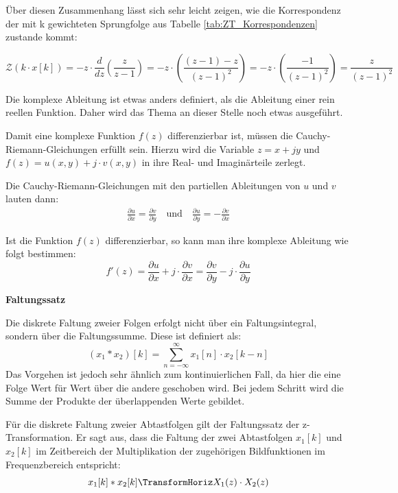 Über diesen Zusammenhang lässt sich sehr leicht zeigen, wie die Korrespondenz der mit k gewichteten Sprungfolge aus Tabelle \ref{tab:ZT_Korrespondenzen} zustande kommt:

\begin{equation}
    \mathcal{Z}(k \cdot x[k]) = -z \cdot \frac{d}{dz} \left(\frac{z}{z-1}\right) = -z \cdot \left(\frac{(z-1) - z}{(z-1)^2}\right) = -z \cdot \left(\frac{-1}{(z-1)^2}\right) = \frac{z}{(z-1)^2}
\end{equation}

Die komplexe Ableitung ist etwas anders definiert, als die Ableitung einer rein reellen Funktion. Daher wird das Thema an dieser Stelle noch etwas ausgeführt.

Damit eine komplexe Funktion $f(z)$ differenzierbar ist, müssen die Cauchy-Riemann-Gleichungen erfüllt sein.
Hierzu wird die Variable $z = x +jy$ und $f(z) = u(x,y) + j \cdot v(x,y)$ in ihre Real- und Imaginärteile zerlegt.

Die Cauchy-Riemann-Gleichungen mit den partiellen Ableitungen von $u$ und $v$ lauten dann:
\begin{align}
    \frac{\partial u}{\partial x} = \frac{\partial v}{\partial y} \quad \text{und} \quad \frac{\partial u}{\partial y} = -\frac{\partial v}{\partial x}
\end{align}

Ist die Funktion $f(z)$ differenzierbar, so kann man ihre komplexe Ableitung wie folgt bestimmen:
\begin{equation}
    f'(z) = \frac{\partial u}{\partial x} + j\cdot \frac{\partial v}{\partial x} = \frac{\partial v}{\partial y} - j\cdot \frac{\partial u}{\partial y}
\end{equation}

\addvspace{1cm}
\textbf{Faltungssatz}

Die diskrete Faltung zweier Folgen erfolgt nicht über ein Faltungsintegral, sondern über die Faltungssumme. Diese ist definiert als:
\begin{equation}
    (x_1 * x_2)[k] = \sum_{n=-\infty}^{\infty} x_1[n] \cdot x_2[k-n]
\end{equation}
Das Vorgehen ist jedoch sehr ähnlich zum kontinuierlichen Fall, da hier die eine Folge Wert für Wert über die andere geschoben wird. Bei jedem Schritt wird die Summe der Produkte der überlappenden Werte gebildet.

Für die diskrete Faltung zweier Abtastfolgen gilt der Faltungssatz der z-Transformation. Er sagt aus, dass die Faltung der zwei Abtastfolgen $x_1[k]$ und $x_2[k]$ im Zeitbereich der Multiplikation der zugehörigen Bildfunktionen im Frequenzbereich entspricht:
\begin{equation}
    x_1[k] * x_2[k] \TransformHoriz X_1(z) \cdot X_2(z)
\end{equation}

